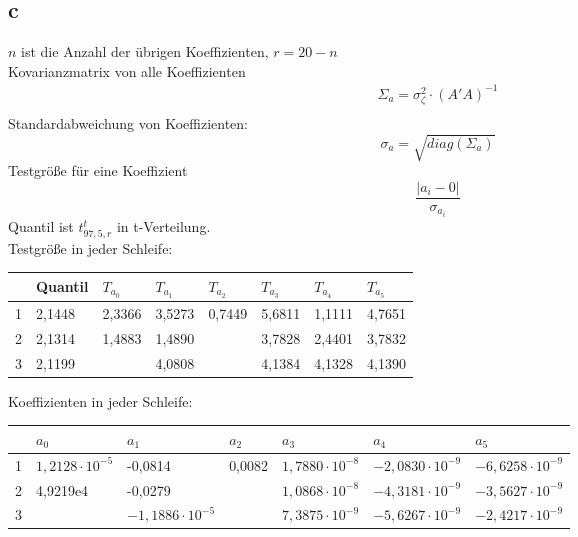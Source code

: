 \subsection{c}
$n$ ist die Anzahl der übrigen Koeffizienten, $r = 20 - n$ \\
Kovarianzmatrix von alle Koeffizienten
\begin{gather*}
	\Sigma_{a} = \sigma_{\zeta}^2 \cdot (A'A)^{-1} \\
\end{gather*}
Standardabweichung von Koeffizienten:
\begin{equation*}
	\sigma_a = \sqrt{ diag(\Sigma_{a})}
\end{equation*}
Testgröße für eine Koeffizient
\begin{equation*}
	\frac{|a_i - 0|}{\sigma_{a_i}}
\end{equation*}
Quantil ist $t^t_{97,5,r}$ in t-Verteilung. \\
Testgröße in jeder Schleife: 
\begin{table}[ht] \centering
	\begin{tabular}{|l|l|l|l|l|l|l|l|}
		\hline
		& Quantil & $T_{a_0}$ & $T_{a_1}$  & $T_{a_2}$ & $T_{a_3}$ & $T_{a_4}$  & $T_{a_5}$  \\ \hline
		1 & 2,1448  & 2,3366  & 3,5273    & 0,7449   & 5,6811 & 1,1111 & 4,7651 \\ \hline
		2 & 2,1314  & 1,4883  & 1,4890    &       & 3,7828 & 2,4401 & 3,7832 \\ \hline
		3 & 2,1199  &       & 4,0808 &      & 4,1384 & 4,1328 & 4,1390 \\ \hline
	\end{tabular}
\end{table}
\newline
Koeffizienten in jeder Schleife:
\begin{table}[ht] \centering
	\begin{tabular}{|l|l|l|l|l|l|l|}
		\hline
		& $a_0$    & $a_1$      & $a_2$  & $a_3$     & $a_4$      & $a_5$      \\ \hline
		1 & $1,2128 \cdot 10^{-5}$ & -0,0814    & 0,0082 & $1,7880 \cdot 10^{-8}$ & $-2,0830 \cdot 10^{-9}$ & $-6,6258 \cdot 10^{-9}$ \\ \hline
		2 & 4,9219e4 & -0,0279    &     & $1,0868\cdot 10^{-8}$ & $-4,3181 \cdot 10^{-9}$ & $-3,5627 \cdot 10^{-9}$ \\ \hline
		3 &       & $-1,1886 \cdot 10^{-5}$ &     & $7,3875 \cdot 10^{-9}$ & $-5,6267 \cdot 10^{-9}$ & $-2,4217 \cdot 10^{-9}$ \\ \hline
	\end{tabular}
\end{table}

